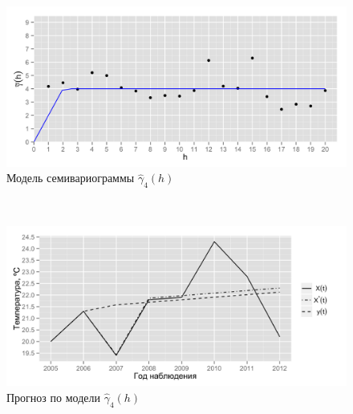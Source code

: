\documentclass{beamer}
\begin{document}
\begin{frame}
\begin{multicols}{2}
    \columnbreak
    \begin{figure}[H]
      \begin{center}
        \begin{minipage}[H]{0.95\linewidth}
          \begin{center}
            \includegraphics[width=1\linewidth]{../../figures/variogram/lin-fit-adapt-modeled.png} \\ Модель семивариограммы $\widehat{\gamma}_4(h)$
          \end{center}
        \end{minipage}
        \\
        \begin{minipage}[H]{0.95\linewidth}
          \begin{center}
            \includegraphics[width=1\linewidth]{../../figures/variogram/lin-fit-adapt-cross-prediction.png} \\ Прогноз по модели $\widehat{\gamma}_4(h)$
          \end{center}
        \end{minipage}
      \end{center}
    \end{figure}
  \end{multicols}
\end{frame}
\end{document}
